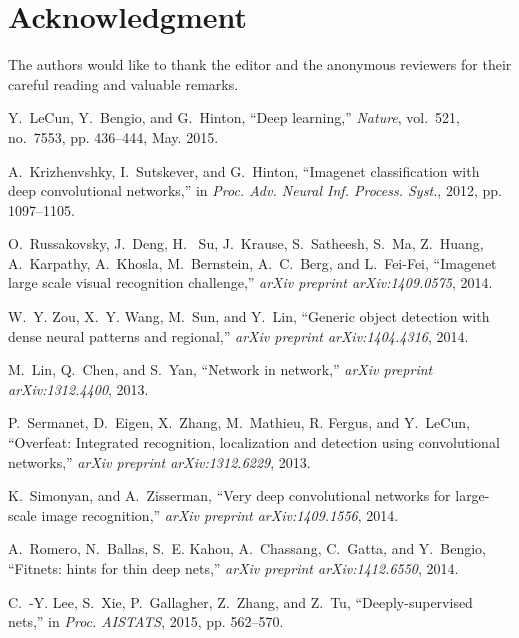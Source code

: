 \documentclass[journal]{IEEEtran}
\begin{document}
\appendices

\section*{Acknowledgment}
The authors would like to thank the editor and the anonymous reviewers for their careful reading and valuable remarks.


\ifCLASSOPTIONcaptionsoff
  \newpage
\fi







\begin{thebibliography}{1}

Y.~LeCun, Y.~Bengio, and G.~Hinton, ``Deep learning,'' \emph{Nature}, vol.~521, no.~7553,
  pp. 436--444, May. 2015.

A.~Krizhenvshky, I.~Sutskever, and G.~Hinton, ``Imagenet classification with deep convolutional networks,'' in
  \emph{Proc. Adv. Neural Inf. Process. Syst.}, 2012, pp. 1097--1105.

O.~Russakovsky, J.~Deng, H. ~Su, J.~Krause, S.~Satheesh, S.~Ma, Z.~Huang, A.~Karpathy, A.~Khosla, M.~Bernstein, A.~C.~Berg, and L.~Fei-Fei, ``Imagenet  large  scale  visual  recognition  challenge,'' \emph{arXiv preprint arXiv:1409.0575}, 2014.

W.~Y. Zou, X.~Y. Wang, M.~Sun, and Y.~Lin, ``Generic object detection with dense neural patterns and regional,'' \emph{arXiv preprint arXiv:1404.4316}, 2014.

M.~Lin, Q.~Chen, and S.~Yan, ``Network in network,'' \emph{arXiv preprint arXiv:1312.4400}, 2013.

P.~Sermanet, D.~Eigen, X.~Zhang, M.~Mathieu, R. Fergus, and Y.~LeCun, ``Overfeat: Integrated recognition, localization and detection using convolutional networks,'' \emph{arXiv preprint arXiv:1312.6229}, 2013.

K.~Simonyan, and A.~Zisserman, ``Very deep convolutional networks for large-scale image recognition,'' \emph{arXiv preprint arXiv:1409.1556}, 2014.

A.~Romero, N.~Ballas, S.~E. Kahou, A.~Chassang, C.~Gatta, and Y.~Bengio, ``Fitnets: hints for thin deep nets,'' \emph{arXiv preprint arXiv:1412.6550}, 2014.

C.~-Y. Lee, S.~Xie, P.~Gallagher, Z.~Zhang, and Z.~Tu, ``Deeply-supervised nets,'' in
  \emph{Proc. AISTATS}, 2015, pp. 562--570.


\end{thebibliography}
\end{document}
